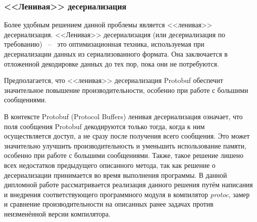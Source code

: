 \subsubsection{<<Ленивая>> десериализация} 

Более удобным решением данной проблемы является <<ленивая>> десериализация.
<<Ленивая>> десериализация (или десериализация по требованию) ~--~ это оптимизационная техника, используемая при десериализации данных из сериализованного формата. 
Она заключается в отложенной декодировке данных до тех пор, пока они не потребуются.

Предполагается, что <<ленивая>> десериализация Protobuf обеспечит значительное повышение производительности, особенно при работе с большими сообщениями.

В контексте Protobuf (Protocol Buffers) ленивая десериализация означает, что поля сообщения Protobuf декодируются только тогда, когда к ним осуществляется доступ, а не сразу после получения всего сообщения. 
Это может значительно улучшить производительность и уменьшить использование памяти, особенно при работе с большими сообщениями.
Также, такое решение лишено всех недостатков предыдущего описанного метода, так как решение о десериализации принимается во время выполнения программы.
В данной дипломной работе рассматривается реализация данного решения путём написания и внедрения соответствующего программного модуля в компилятор \textit{protoc}, замер и сравнение производительности на описанных ранее задачах против неизменённой версии компилятора.
